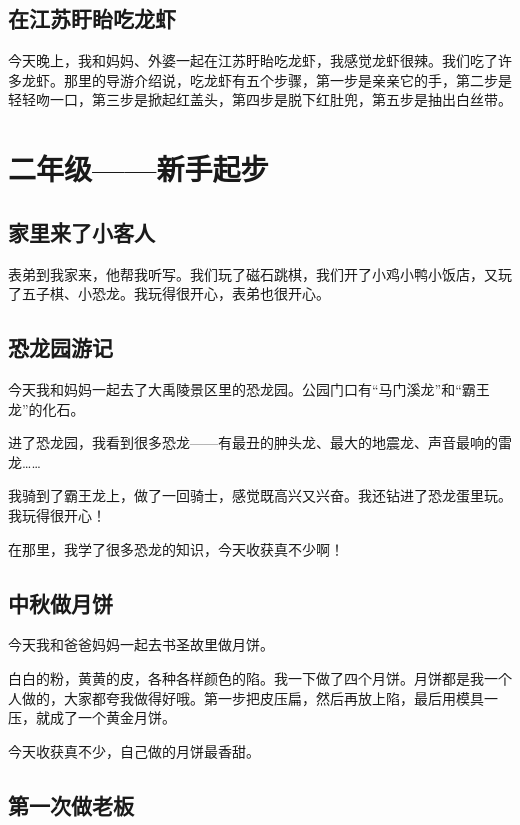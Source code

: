 \documentclass[UTF8,a4paper,titlepage,twoside,10.5pt]{article}
\begin{document}
\subsection{在江苏盱眙吃龙虾}
\label{sec:orgd1499b1}

今天晚上，我和妈妈、外婆一起在江苏盱眙吃龙虾，我感觉龙虾很辣。我们吃了许多龙虾。那里的导游介绍说，吃龙虾有五个步骤，第一步是亲亲它的手，第二步是轻轻吻一口，第三步是掀起红盖头，第四步是脱下红肚兜，第五步是抽出白丝带。

\newpage

\section{二年级——新手起步}
\label{sec:orgfcbb2eb}

\subsection{家里来了小客人}
\label{sec:org12c956b}

表弟到我家来，他帮我听写。我们玩了磁石跳棋，我们开了小鸡小鸭小饭店，又玩了五子棋、小恐龙。我玩得很开心，表弟也很开心。

\subsection{恐龙园游记}
\label{sec:org28ed8b4}

今天我和妈妈一起去了大禹陵景区里的恐龙园。公园门口有“马门溪龙”和“霸王龙”的化石。

进了恐龙园，我看到很多恐龙——有最丑的肿头龙、最大的地震龙、声音最响的雷龙……

我骑到了霸王龙上，做了一回骑士，感觉既高兴又兴奋。我还钻进了恐龙蛋里玩。我玩得很开心！

在那里，我学了很多恐龙的知识，今天收获真不少啊！

\subsection{中秋做月饼}
\label{sec:org785dce9}

今天我和爸爸妈妈一起去书圣故里做月饼。

白白的粉，黄黄的皮，各种各样颜色的陷。我一下做了四个月饼。月饼都是我一个人做的，大家都夸我做得好哦。第一步把皮压扁，然后再放上陷，最后用模具一压，就成了一个黄金月饼。

今天收获真不少，自己做的月饼最香甜。

\subsection{第一次做老板}
\label{sec:org6dae68a}
\end{document}

